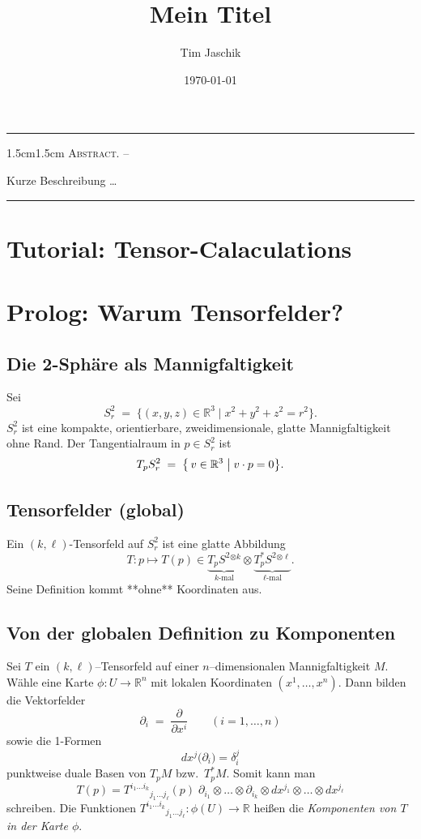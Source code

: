 \documentclass[10pt, letterpaper]{article}
\title{Mein Titel}
\author{Tim Jaschik}
\date{\today}
\newcommand{\R}{\mathbb{R}}
\renewenvironment{abstract}
  {
    \begin{adjustwidth}{1.5cm}{1.5cm}
    \small
    \textsc{Abstract. –}%
  }
  {
    \end{adjustwidth}
  }
\begin{document}
\maketitle
\rule{\textwidth}{0.5pt}
\begin{abstract}
Kurze Beschreibung …
\end{abstract}
\rule{\textwidth}{0.5pt}
\vspace{0.5cm}

\tableofcontents

\pagebreak




\section{Tutorial: Tensor-Calaculations}

\section*{Prolog: Warum Tensorfelder?}

\subsection*{Die 2-Sphäre als Mannigfaltigkeit}
Sei
\[
  S^{2}_{r} \;=\; \bigl\{ (x,y,z)\in\mathbb R^{3}\mid x^{2}+y^{2}+z^{2}=r^{2} \bigr\}.
\]
$S^{2}_{r}$ ist eine kompakte, orientierbare, zweidimensionale, glatte Mannigfaltigkeit
ohne Rand.  Der Tangentialraum in $p\in S^{2}_{r}$ ist
\[
  T_{p}S^{2}_{r} \;=\; \bigl\{\,v\in\mathbb R^{3}\bigm| v\cdot p = 0\bigr\}.
\]

\subsection*{Tensorfelder (global)}
Ein \((k,\ell)\)\mbox{-}Tensorfeld auf $S^{2}_{r}$ ist eine glatte Abbildung
\[
  T\colon p \longmapsto T(p)\in \underbrace{T_{p}S^{2}{}^{\otimes k}}_{k\text{-mal}}
  \otimes \underbrace{T_{p}^{*}S^{2}{}^{\otimes \ell}}_{\ell\text{-mal}} .
\]
Seine Definition kommt **ohne** Koordinaten aus.

\subsection*{Von der globalen Definition zu Komponenten}

Sei $T$ ein $(k,\ell)$–Tensorfeld auf einer $n$–dimensionalen Mannigfaltigkeit $M$.
Wähle eine Karte $\phi\colon U\to\R^{n}$ mit lokalen Koordinaten $(x^{1},\dots,x^{n})$.
Dann bilden die Vektorfelder
\[
  \partial_{i}\;=\;\frac{\partial}{\partial x^{i}}
\qquad(i=1,\dots,n)
\]
sowie die 1-Formen
\[
  dx^{j}\bigl(\partial_{i}\bigr)=\delta^{j}_{i}
\]
punktweise duale Basen von $T_{p}M$ bzw.\ $T_{p}^{*}M$.
Somit kann man
\[
  T(p)=
  T^{i_{1}\dots i_{k}}{}_{j_{1}\dots j_{\ell}}(p)\;
  \partial_{i_{1}}\!\otimes\!\dots\!\otimes\!\partial_{i_{k}}
  \otimes
  dx^{j_{1}}\!\otimes\!\dots\!\otimes\!dx^{j_{\ell}}
\]
schreiben.  
Die Funktionen $T^{i_{1}\dots i_{k}}{}_{j_{1}\dots j_{\ell}}\colon\phi(U)\to\R$
heißen die \emph{Komponenten von $T$ in der Karte $\phi$}.
\end{document}
